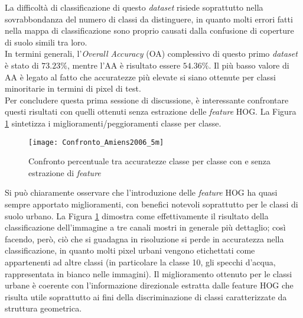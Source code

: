 La difficoltà di classificazione di questo \emph{dataset} risiede
soprattutto nella sovrabbondanza del numero di classi da distinguere,
in quanto molti errori fatti nella mappa di classificazione sono
proprio causati dalla confusione di coperture di suolo simili tra
loro.\\

In termini generali, l'\emph{Overall Accuracy} (OA) complessivo di
questo primo \emph{dataset} è stato di $73.23\%$, mentre l'AA è
risultato essere $54.36\%$. Il più basso valore di AA è legato al
fatto che accuratezze più elevate si siano ottenute per classi
minoritarie in termini di pixel di test.\\

Per concludere questa prima sessione di discussione, è interessante
confrontare questi risultati con quelli ottenuti senza estrazione
delle \emph{feature} HOG. La Figura \ref{fig:Confronto_Amiens2006_5m}
sintetizza i miglioramenti/peggioramenti classe per classe.

\begin{figure}[!ht]

\texttt{[image: Confronto\_Amiens2006\_5m]}

\caption{Confronto percentuale tra accuratezze classe per classe con e
senza estrazione di \emph{feature}}

\label{fig:Confronto_Amiens2006_5m}

\end{figure}

Si può chiaramente osservare che l'introduzione delle \emph{feature}
HOG ha quasi sempre apportato miglioramenti, con benefici notevoli
soprattutto per le classi di suolo urbano. La Figura
\ref{fig:Confronto_Amiens2006_5m} dimostra come effettivamente il
risultato della classificazione dell'immagine a tre canali mostri in
generale più dettaglio; così facendo, però, ciò che si guadagna in
risoluzione si perde in accuratezza nella classificazione, in quanto
molti pixel urbani vengono etichettati come appartenenti ad altre
classi (in particolare la classe 10, gli specchi d'acqua,
rappresentata in bianco nelle immagini). Il miglioramento ottenuto per
le classi urbane è coerente con l'informazione direzionale estratta
dalle feature HOG che risulta utile soprattutto ai fini della
discriminazione di classi caratterizzate da struttura geometrica.


